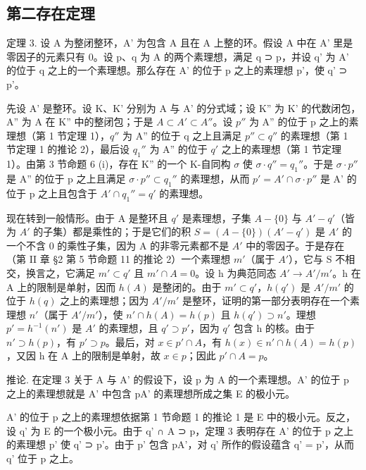 \subsection{第二存在定理}

定理 3. 设 A 为整闭整环，A' 为包含 A 且在 A 上整的环。假设 A 中在 A' 里是零因子的元素只有 0。设 p、q 为 A 的两个素理想，满足 q ⊃ p，并设 q' 为 A' 的位于 q 之上的一个素理想。那么存在 A' 的位于 p 之上的素理想 p'，使 q' ⊃ p'。

先设 A' 是整环。设 K、K' 分别为 A 与 A' 的分式域；设 K'' 为 K' 的代数闭包，A'' 为 A 在 K'' 中的整闭包；于是 \(A \subset A' \subset A''\)。设 \(p''\) 为 A'' 的位于 p 之上的素理想（第 1 节定理 1），\(q''\) 为 A'' 的位于 q 之上且满足 \(p'' \subset q''\) 的素理想（第 1 节定理 1 的推论 2），最后设 \(q_{1}''\) 为 A'' 的位于 \(q'\) 之上的素理想（第 1 节定理 1）。由第 3 节命题 6 (i)，存在 K'' 的一个 K-自同构 \(\sigma\) 使 \(\sigma \cdot q'' = q_{1}''\)。于是 \(\sigma \cdot p''\) 是 A'' 的位于 p 之上且满足 \(\sigma \cdot p'' \subset q_{1}''\) 的素理想，从而 \(p' = A' \cap \sigma \cdot p''\) 是 A' 的位于 p 之上且包含于 \(A' \cap q_{1}'' = q'\) 的素理想。

现在转到一般情形。由于 A 是整环且 \(q'\) 是素理想，子集 \(A - \{0\}\) 与 \(A' - q'\)（皆为 \(A'\) 的子集）都是乘性的；于是它们的积 \(S = (A - \{0\})(A' - q')\) 是 \(A'\) 的一个不含 0 的乘性子集，因为 A 的非零元素都不是 \(A'\) 中的零因子。于是存在（第 II 章 §2 第 5 节命题 11 的推论 2）一个素理想 \(m'\)（属于 \(A'\)），它与 S 不相交，换言之，它满足 \(m' \subset q'\) 且 \(m' \cap A = 0\)。设 h 为典范同态 \(A' \to A'/m'\)。h 在 A 上的限制是单射，因而 \(h(A)\) 是整闭的。由于 \(m' \subset q'\)，\(h(q')\) 是 \(A'/m'\) 的位于 \(h(q)\) 之上的素理想；因为 \(A'/m'\) 是整环，证明的第一部分表明存在一个素理想 \(n'\)（属于 \(A'/m'\)），使 \(n' \cap h(A) = h(p)\) 且 \(h(q') \supset n'\)。理想 \(p' = h^{-1}(n')\) 是 \(A'\) 的素理想，且 \(q' \supset p'\)，因为 \(q'\) 包含 h 的核。由于 \(n' \supset h(p)\)，有 \(p' \supset p\)。最后，对 \(x \in p' \cap A\)，有 \(h(x) \in n' \cap h(A) = h(p)\)，又因 h 在 A 上的限制是单射，故 \(x \in p\)；因此 \(p' \cap A = p\)。

推论. 在定理 3 关于 A 与 A' 的假设下，设 p 为 A 的一个素理想。A' 的位于 p 之上的素理想就是 A' 中包含 pA' 的素理想所成之集 E 的极小元。

A' 的位于 p 之上的素理想依据第 1 节命题 1 的推论 1 是 E 中的极小元。反之，设 q' 为 E 的一个极小元。由于 q' ∩ A ⊃ p，定理 3 表明存在 A' 的位于 p 之上的素理想 p' 使 q' ⊃ p'。由于 p' 包含 pA'，对 q' 所作的假设蕴含 q' = p'，从而 q' 位于 p 之上。

